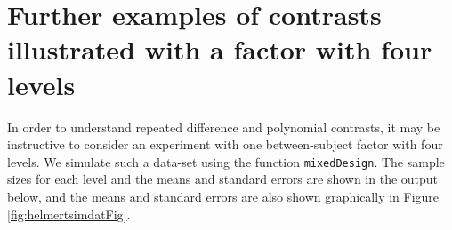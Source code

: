 \documentclass[12pt,]{krantz}
\newenvironment{Shaded}{\begin{snugshade}}{\end{snugshade}}
\newcommand{\KeywordTok}[1]{\textcolor[rgb]{0.13,0.29,0.53}{\textbf{#1}}}
\newcommand{\DataTypeTok}[1]{\textcolor[rgb]{0.13,0.29,0.53}{#1}}
\newcommand{\DecValTok}[1]{\textcolor[rgb]{0.00,0.00,0.81}{#1}}
\newcommand{\StringTok}[1]{\textcolor[rgb]{0.31,0.60,0.02}{#1}}
\newcommand{\CommentTok}[1]{\textcolor[rgb]{0.56,0.35,0.01}{\textit{#1}}}
\newcommand{\OtherTok}[1]{\textcolor[rgb]{0.56,0.35,0.01}{#1}}
\newcommand{\OperatorTok}[1]{\textcolor[rgb]{0.81,0.36,0.00}{\textbf{#1}}}
\newcommand{\NormalTok}[1]{#1}
\theoremstyle{definition}
\theoremstyle{definition}
\theoremstyle{definition}
\theoremstyle{remark}
\begin{document}
\section{Further examples of contrasts illustrated with a factor with
four
levels}\label{further-examples-of-contrasts-illustrated-with-a-factor-with-four-levels}

In order to understand repeated difference and polynomial contrasts, it
may be instructive to consider an experiment with one between-subject
factor with four levels. We simulate such a data-set using the function
\texttt{mixedDesign}. The sample sizes for each level and the means and
standard errors are shown in the output below, and the means and
standard errors are also shown graphically in Figure
\ref{fig:helmertsimdatFig}.

\begin{Shaded}
\end{Shaded}
\end{document}
